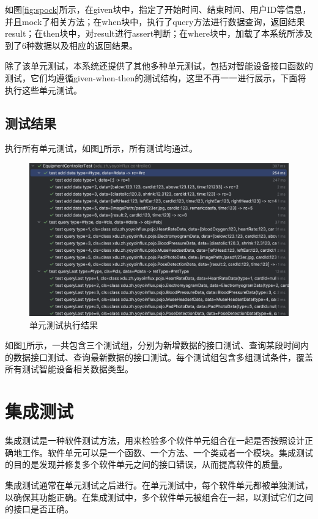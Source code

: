 \documentclass[oneside]{xduugthesis}
\begin{document}
如图\ref{fig:spock}所示，在given块中，指定了开始时间、结束时间、用户ID等信息，并且mock了相关方法；在when块中，执行了query方法进行数据查询，返回结果result；在then块中，对result进行assert判断；在where块中，加载了本系统所涉及到了6种数据以及相应的返回结果。

除了该单元测试，本系统还提供了其他多种单元测试，包括对智能设备接口函数的测试，它们均遵循given-when-then的测试结构，这里不再一一进行展示，下面将执行这些单元测试。

\subsection{测试结果}

执行所有单元测试，如图\ref{fig:spock-result}所示，所有测试均通过。

\begin{figure}[htb]
    \centering
    \includegraphics[width=0.8\linewidth]{yoyo-tex//images/spock-result.png}
    \caption{单元测试执行结果}
    \label{fig:spock-result}
\end{figure}

如图\ref{fig:spock-result}所示，一共包含三个测试组，分别为新增数据的接口测试、查询某段时间内的数据接口测试、查询最新数据的接口测试。每个测试组包含多组测试条件，覆盖所有测试智能设备相关数据类型。

\section{集成测试}

集成测试是一种软件测试方法，用来检验多个软件单元组合在一起是否按照设计正确地工作。软件单元可以是一个函数、一个方法、一个类或者一个模块。集成测试的目的是发现并修复多个软件单元之间的接口错误，从而提高软件的质量。

集成测试通常在单元测试之后进行。在单元测试中，每个软件单元都被单独测试，以确保其功能正确。在集成测试中，多个软件单元被组合在一起，以测试它们之间的接口是否正确。
\end{document}
